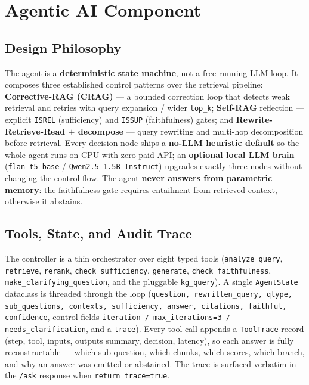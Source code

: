 \documentclass[12pt,a4paper]{article}
\begin{document}
\section{Agentic AI Component}
\label{sec:agent}

\subsection{Design Philosophy}

The agent is a \textbf{deterministic state machine}, not a free-running LLM loop. It composes three established control patterns over the retrieval pipeline: \textbf{Corrective-RAG (CRAG)} --- a bounded correction loop that detects weak retrieval and retries with query expansion / wider \texttt{top\_k}; \textbf{Self-RAG} reflection --- explicit \texttt{ISREL} (sufficiency) and \texttt{ISSUP} (faithfulness) gates; and \textbf{Rewrite-Retrieve-Read $+$ decompose} --- query rewriting and multi-hop decomposition before retrieval. Every decision node ships a \textbf{no-LLM heuristic default} so the whole agent runs on CPU with zero paid API; an \textbf{optional local LLM brain} (\texttt{flan-t5-base} / \texttt{Qwen2.5-1.5B-Instruct}) upgrades exactly three nodes without changing the control flow. The agent \textbf{never answers from parametric memory}: the faithfulness gate requires entailment from retrieved context, otherwise it abstains.

\subsection{Tools, State, and Audit Trace}

The controller is a thin orchestrator over eight typed tools (\texttt{analyze\_query}, \texttt{retrieve}, \texttt{rerank}, \texttt{check\_sufficiency}, \texttt{generate}, \texttt{check\_faithfulness}, \texttt{make\_clarifying\_question}, and the pluggable \texttt{kg\_query}). A single \texttt{AgentState} dataclass is threaded through the loop (\texttt{question, rewritten\_query, qtype, sub\_questions, contexts, sufficiency, answer, citations, faithful, confidence}, control fields \texttt{iteration / max\_iterations=3 / needs\_clarification}, and a \texttt{trace}). Every tool call appends a \texttt{ToolTrace} record (step, tool, inputs, outputs summary, decision, latency), so each answer is fully reconstructable --- which sub-question, which chunks, which scores, which branch, and why an answer was emitted or abstained. The trace is surfaced verbatim in the \texttt{/ask} response when \texttt{return\_trace=true}.
\end{document}
